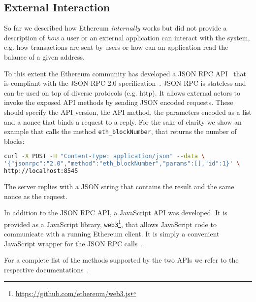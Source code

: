 \subsection{External Interaction}

So far we described how Ethereum \emph{internally} works but did not provide
a description of \emph{how} a user or an external application can interact with 
the system, e.g. how transactions are sent by users or how can an application
read the balance of a given address.

To this extent the Ethereum community has developed a JSON RPC
API~\cite{bib:json-rpc} that is compliant with the
JSON RPC 2.0 specification~\cite{bib:json2012json}.
JSON RPC is stateless and can be used on top of diverse protocols (e.g. http).
It allows external actors to invoke the exposed API methods by sending
JSON encoded requests. These should specify the
API version, the API method, the parameters encoded as a list and a nonce
that binds a request to a reply.
For the sake of clarity we show an example that calls the method 
\verb|eth_blockNumber|, that returns the number of blocks:

\begin{lstlisting}[language=bash]
curl -X POST -H "Content-Type: application/json" --data \
'{"jsonrpc":"2.0","method":"eth_blockNumber","params":[],"id":1}' \
http://localhost:8545
\end{lstlisting} 
The server replies with a JSON string that contains the result and the same
nonce as the request.




In addition to the JSON RPC API, a JavaScript API was developed. It is provided
as a JavaScript library, 
\texttt{web3}\footnote{\url{https://github.com/ethereum/web3.js}}, that allows
JavaScript code to
communicate with a running Ethereum client. It is simply a convenient
JavaScript wrapper for the JSON RPC calls~\cite{bib:javascript-api}.

For a complete list of the methods supported by the two APIs we refer to the
respective documentations~\cite{bib:json-rpc, bib:javascript-api}. 

